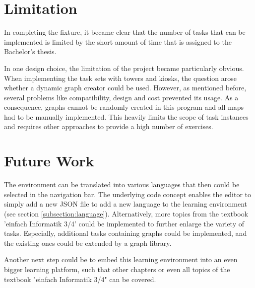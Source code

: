 \section{Limitation}
\label{section:limitation}
In completing the fixture, it became clear that the number of tasks that can be implemented is limited by the short amount of time that is assigned to the Bachelor's thesis. 

In one design choice, the limitation of the project became particularly obvious. When implementing the task sets with towers and kiosks, the question arose whether a dynamic graph creator could be used. However, as mentioned before, several problems like compatibility, design and cost prevented its usage. 
As a consequence, graphs cannot be randomly created in this program and all maps had to be manually implemented. This heavily limits the scope of task instances and requires other approaches to provide a high number of exercises.


\section{Future Work}
\label{section:future}
The environment can be translated into various languages that then could be selected in the navigation bar. The underlying code concept enables the editor to simply add a new JSON file to add a new language to the learning environment (see section \ref{subsection:language}). 
Alternatively, more topics from the textbook 'einfach Informatik 3/4' could be implemented to further enlarge the variety of tasks. Especially, additional tasks containing graphs could be implemented, and the existing ones could be extended by a graph library.

Another next step could be to embed this learning environment into an even bigger learning platform, such that other chapters or even all topics of the textbook "einfach Informatik 3/4" can be covered. 